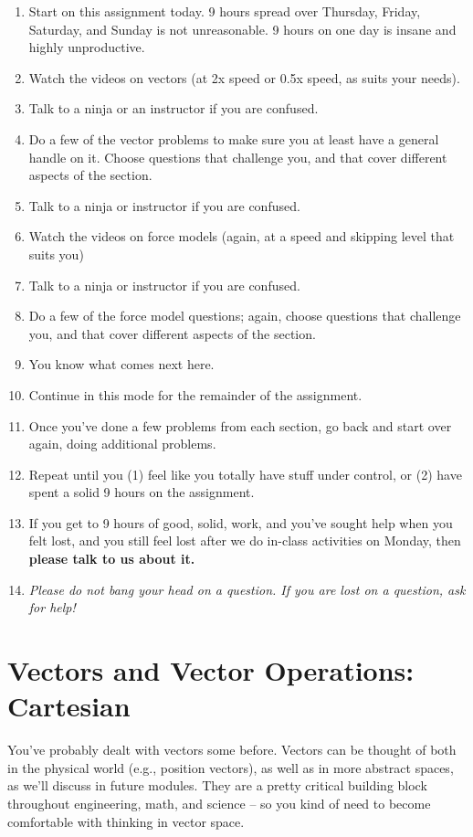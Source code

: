 \documentclass{tufte-handout}
\begin{document}
\begin{enumerate}
\item Start on this assignment today.  9 hours spread over Thursday, Friday, Saturday, and Sunday is not unreasonable.  9 hours on one day is insane and highly unproductive.
\item Watch the videos on vectors (at 2x speed or 0.5x speed, as suits your needs).
\item Talk to a ninja or an instructor if you are confused.
\item Do a few of the vector problems to make sure you at least have a general handle on it.  Choose questions that challenge you, and that cover different aspects of the section.
\item Talk to a ninja or instructor if you are confused.
\item Watch the videos on force models (again, at a speed and skipping level that suits you)
\item Talk to a ninja or instructor if you are confused.
\item Do a few of the force model questions; again, choose questions that challenge you, and that cover different aspects of the section.
\item You know what comes next here.
\item Continue in this mode for the remainder of the assignment.
\item Once you've done a few problems from each section, go back and start over again, doing additional problems.
\item Repeat until you (1) feel like you totally have stuff under control, or (2) have spent a solid 9 hours on the assignment.  \item If you get to 9 hours of good, solid, work, and you've sought help when you felt lost, and you still feel lost after we do in-class activities on Monday, then {\bf please talk to us about it.}
\item {\it Please do not bang your head on a question.  If you are lost on a question, ask for help!}
\end{enumerate}


\section{Vectors and Vector Operations: Cartesian}

You've probably dealt with vectors some before. Vectors can be thought of both in the physical world (e.g., position vectors), as well as in more abstract spaces, as we'll discuss in future modules. They are a pretty critical building block throughout engineering, math, and science -- so you kind of need to become comfortable with thinking in vector space.
\end{document}
